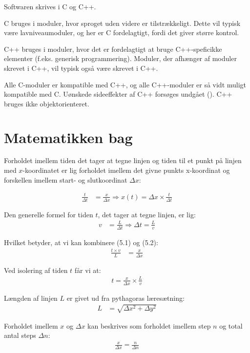 Softwaren skrives i C og C++.

C bruges i moduler, hvor sproget uden videre er tilstrækkeligt. Dette
vil typisk være lavniveaumoduler, og her er C fordelagtigt, fordi det
giver større kontrol.

C++ bruges i moduler, hvor det er fordelagtigt at bruge C++-speficikke
elementer (f.eks. generisk programmering). Moduler, der afhænger af moduler skrevet i C++, vil typisk
også være skrevet i C++.

Alle C-moduler er kompatible med C++, og alle C++-moduler er så vidt
muligt kompatible med C. Uønskede sideeffekter af C++ forsøges undgået
(). C++ bruges ikke objektorienteret.

\section{Matematikken bag}

Forholdet imellem tiden det tager at tegne linjen og tiden til et
punkt på linjen med $x$-koordinatet er lig forholdet imellem det givne
punkts x-koordinat og forskellen imellem start- og slutkoordinat $\Delta x$:

\begin{align}
\frac{t}{\Delta t} &= \frac{x}{\Delta x} \Rightarrow x(t) = \Delta x \times \frac{t}{\Delta t}
\end{align}

Den generelle formel for tiden $t$, det tager at tegne linjen, er lig:
\begin{align}
v &= \frac{L}{\Delta t} \Rightarrow \Delta t= \frac{L}{v}
\end{align}

Hvilket betyder, at vi kan kombinere (5.1) og (5.2):
\begin{align*}
\frac{t \times v}{L} &= \frac{x}{\Delta x}
\end{align*}

Ved isolering af tiden $t$ får vi at:
\begin{align}
t = \frac{x}{\Delta x} \times \frac{L}{v}
\end{align}

Længden af linjen $L$ er givet ud fra pythagoras læresætning:
\begin{align*}
L &= \sqrt{\Delta x^2+\Delta y^2}
\end{align*}

Forholdet imellem $x$ og $\Delta x$ kan beskrives som forholdet imellem step $n$ og total antal steps $\Delta n$:
\begin{align}
\frac{x}{\Delta x} = \frac{n}{\Delta n}
\end{align}

